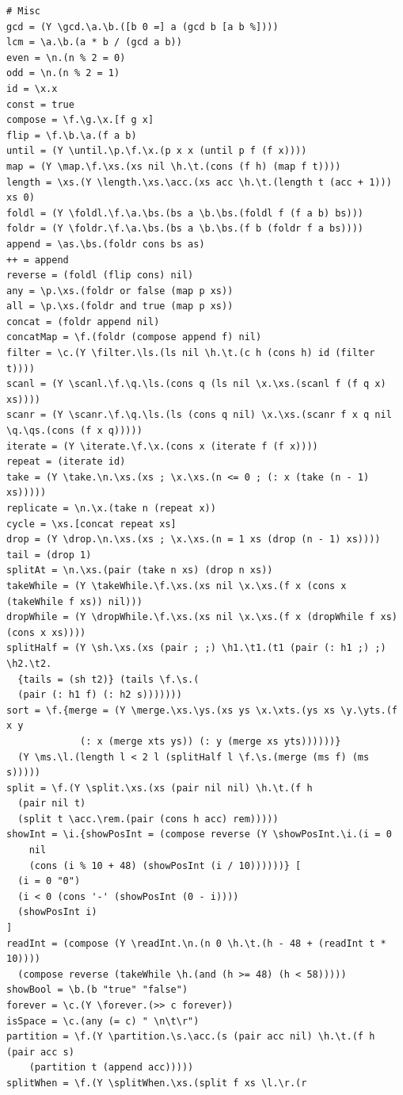 \begin{verbatim}
# Misc
gcd = (Y \gcd.\a.\b.([b 0 =] a (gcd b [a b %])))
lcm = \a.\b.(a * b / (gcd a b))
even = \n.(n % 2 = 0)
odd = \n.(n % 2 = 1)
id = \x.x
const = true
compose = \f.\g.\x.[f g x]
flip = \f.\b.\a.(f a b)
until = (Y \until.\p.\f.\x.(p x x (until p f (f x)))) 
map = (Y \map.\f.\xs.(xs nil \h.\t.(cons (f h) (map f t))))
length = \xs.(Y \length.\xs.\acc.(xs acc \h.\t.(length t (acc + 1))) xs 0)
foldl = (Y \foldl.\f.\a.\bs.(bs a \b.\bs.(foldl f (f a b) bs)))
foldr = (Y \foldr.\f.\a.\bs.(bs a \b.\bs.(f b (foldr f a bs))))
append = \as.\bs.(foldr cons bs as)
++ = append
reverse = (foldl (flip cons) nil) 
any = \p.\xs.(foldr or false (map p xs))
all = \p.\xs.(foldr and true (map p xs))
concat = (foldr append nil)
concatMap = \f.(foldr (compose append f) nil)
filter = \c.(Y \filter.\ls.(ls nil \h.\t.(c h (cons h) id (filter t))))
scanl = (Y \scanl.\f.\q.\ls.(cons q (ls nil \x.\xs.(scanl f (f q x) xs))))
scanr = (Y \scanr.\f.\q.\ls.(ls (cons q nil) \x.\xs.(scanr f x q nil \q.\qs.(cons (f x q)))))
iterate = (Y \iterate.\f.\x.(cons x (iterate f (f x))))
repeat = (iterate id)
take = (Y \take.\n.\xs.(xs ; \x.\xs.(n <= 0 ; (: x (take (n - 1) xs)))))
replicate = \n.\x.(take n (repeat x))
cycle = \xs.[concat repeat xs]
drop = (Y \drop.\n.\xs.(xs ; \x.\xs.(n = 1 xs (drop (n - 1) xs))))
tail = (drop 1)
splitAt = \n.\xs.(pair (take n xs) (drop n xs))
takeWhile = (Y \takeWhile.\f.\xs.(xs nil \x.\xs.(f x (cons x (takeWhile f xs)) nil)))
dropWhile = (Y \dropWhile.\f.\xs.(xs nil \x.\xs.(f x (dropWhile f xs) (cons x xs))))
splitHalf = (Y \sh.\xs.(xs (pair ; ;) \h1.\t1.(t1 (pair (: h1 ;) ;) \h2.\t2.
  {tails = (sh t2)} (tails \f.\s.(
  (pair (: h1 f) (: h2 s)))))))
sort = \f.{merge = (Y \merge.\xs.\ys.(xs ys \x.\xts.(ys xs \y.\yts.(f x y 
             (: x (merge xts ys)) (: y (merge xs yts))))))}
  (Y \ms.\l.(length l < 2 l (splitHalf l \f.\s.(merge (ms f) (ms s)))))
split = \f.(Y \split.\xs.(xs (pair nil nil) \h.\t.(f h 
  (pair nil t)
  (split t \acc.\rem.(pair (cons h acc) rem)))))
showInt = \i.{showPosInt = (compose reverse (Y \showPosInt.\i.(i = 0
    nil 
    (cons (i % 10 + 48) (showPosInt (i / 10))))))} [
  (i = 0 "0") 
  (i < 0 (cons '-' (showPosInt (0 - i))))
  (showPosInt i)
]
readInt = (compose (Y \readInt.\n.(n 0 \h.\t.(h - 48 + (readInt t * 10))))
  (compose reverse (takeWhile \h.(and (h >= 48) (h < 58)))))
showBool = \b.(b "true" "false")
forever = \c.(Y \forever.(>> c forever))
isSpace = \c.(any (= c) " \n\t\r")
partition = \f.(Y \partition.\s.\acc.(s (pair acc nil) \h.\t.(f h (pair acc s)
    (partition t (append acc))))) 
splitWhen = \f.(Y \splitWhen.\xs.(split f xs \l.\r.(r 

\end{verbatim}
